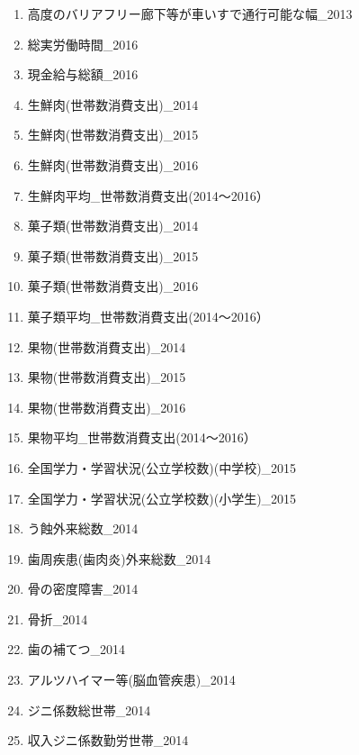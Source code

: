 \begin{multicols}{2}
\begin{enumerate}
  \item  高度のバリアフリー廊下等が車いすで通行可能な幅\_2013
  \item  総実労働時間\_2016
  \item  現金給与総額\_2016
  \item  生鮮肉(世帯数消費支出)\_2014
  \item  生鮮肉(世帯数消費支出)\_2015
  \item  生鮮肉(世帯数消費支出)\_2016
  \item  生鮮肉平均\_世帯数消費支出(2014〜2016）
  \item  菓子類(世帯数消費支出)\_2014
  \item  菓子類(世帯数消費支出)\_2015
  \item  菓子類(世帯数消費支出)\_2016
  \item  菓子類平均\_世帯数消費支出(2014〜2016）
  \item  果物(世帯数消費支出)\_2014
  \item  果物(世帯数消費支出)\_2015
  \item  果物(世帯数消費支出)\_2016
  \item  果物平均\_世帯数消費支出(2014〜2016）
  \item  全国学力・学習状況(公立学校数)(中学校)\_2015
  \item  全国学力・学習状況(公立学校数)(小学生)\_2015
  \item  う蝕外来総数\_2014
  \item  歯周疾患(歯肉炎)外来総数\_2014
  \item  骨の密度障害\_2014
  \item  骨折\_2014
  \item  歯の補てつ\_2014
  \item  アルツハイマー等(脳血管疾患)\_2014
  \item  ジニ係数総世帯\_2014
  \item  収入ジニ係数勤労世帯\_2014
\end{enumerate}

\end{multicols}



